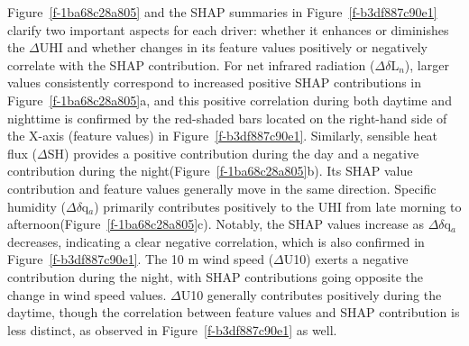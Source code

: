 Figure~\ref{f-1ba68c28a805} and the SHAP summaries in Figure~\ref{f-b3df887c90e1}  clarify two important aspects for each driver: whether it enhances or diminishes the \ensuremath{\Delta }UHI and whether changes in its feature values positively or negatively correlate with the SHAP contribution. For net infrared radiation (\ensuremath{\Delta }\ensuremath{\delta }L\ensuremath{_{n}}), larger values consistently correspond to increased positive SHAP contributions in Figure~\ref{f-1ba68c28a805}a, and this positive correlation during both daytime and nighttime is confirmed by the red-shaded bars located on the right-hand side of the X-axis (feature values) in Figure~\ref{f-b3df887c90e1}. Similarly, sensible heat flux (\ensuremath{\Delta }SH) provides a positive contribution during the day and a negative contribution during the night(Figure~\ref{f-1ba68c28a805}b). Its SHAP value contribution and feature values generally move in the same direction. Specific humidity (\ensuremath{\Delta }\ensuremath{\delta }q\ensuremath{_{a}}) primarily contributes positively to the UHI from late morning to afternoon(Figure~\ref{f-1ba68c28a805}c). Notably, the SHAP values increase as \ensuremath{\Delta }\ensuremath{\delta }q\ensuremath{_{a}} decreases, indicating a clear negative correlation, which is also confirmed in Figure~\ref{f-b3df887c90e1}. The 10 m wind speed (\ensuremath{\Delta }U10) exerts a negative contribution during the night, with SHAP contributions going opposite the change in wind speed values. \ensuremath{\Delta }U10 generally contributes positively during the daytime, though the correlation between feature values and SHAP contribution is less distinct, as observed in Figure~\ref{f-b3df887c90e1}  as well. 


\bgroup
{}
\begin{figure*}[!htbp]
\centering \makeatletter{}
\makeatother 
\caption{{\textbf{Global hourly key feature SHAP contributions to \ensuremath{\Delta }UHI and feature values. }Hourly SHAP contributions (bars, \ensuremath{^\circ}C, left y-axis) and mean feature values (lines, right y-axis) for the global climate zone. Panels show: (a) net infrared radiation (\ensuremath{\Delta }\ensuremath{\delta }L\ensuremath{_{n}} in W/m\ensuremath{^2}), (b) sensible heat (\ensuremath{\Delta }SH in W/m\ensuremath{^2}), (c) 2-m specific humidity (\ensuremath{\Delta }\ensuremath{\delta }q\ensuremath{_{a}} in kg/kg ), (d) 10m wind speed (\ensuremath{\Delta }U10 in m/s), (e) 10 cm soil liquid water (\ensuremath{\Delta }\ensuremath{\Theta}10cm), and (f) ground heat flux (\ensuremath{\Delta }\ensuremath{\delta }G in W/m\ensuremath{^2}). Feature colors match Figure~\ref{f-85092bb5ad6f}.}}
\label{f-1ba68c28a805}
\end{figure*}
\egroup




